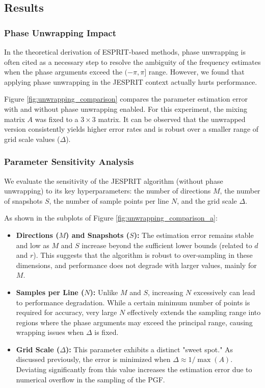 \subsection{Results}

\subsubsection{Phase Unwrapping Impact}
In the theoretical derivation of ESPRIT-based methods, phase unwrapping is often cited as a necessary step to resolve the ambiguity of the frequency estimates when the phase arguments exceed the $(-\pi, \pi]$ range. However, we found that applying phase unwrapping in the JESPRIT context actually hurts performance.

Figure \ref{fig:unwrapping_comparison} compares the parameter estimation error with and without phase unwrapping enabled. For this experiment, the mixing matrix $A$ was fixed to a $3 \times 3$ matrix. It can be observed that the unwrapped version consistently yields higher error rates and is robust over a smaller range of grid scale values ($\Delta$).

\subsubsection{Parameter Sensitivity Analysis}
We evaluate the sensitivity of the JESPRIT algorithm (without phase unwrapping) to its key hyperparameters: the number of directions $M$, the number of snapshots $S$, the number of sample points per line $N$, and the grid scale $\Delta$.

As shown in the subplots of Figure \ref{fig:unwrapping_comparison_a}:
\begin{itemize}
    \item \textbf{Directions ($M$) and Snapshots ($S$):} The estimation error remains stable and low as $M$ and $S$ increase beyond the sufficient lower bounds (related to $d$ and $r$). This suggests that the algorithm is robust to over-sampling in these dimensions, and performance does not degrade with larger values, mainly for $M$.
    \item \textbf{Samples per Line ($N$):} Unlike $M$ and $S$, increasing $N$ excessively can lead to performance degradation. While a certain minimum number of points is required for accuracy, very large $N$ effectively extends the sampling range into regions where the phase arguments may exceed the principal range, causing wrapping issues when $\Delta$ is fixed.
    \item \textbf{Grid Scale ($\Delta$):} This parameter exhibits a distinct "sweet spot." As discussed previously, the error is minimized when $\Delta \approx 1/\max(A)$. Deviating significantly from this value increases the estimation error due to numerical overflow in the sampling of the PGF.
\end{itemize}

